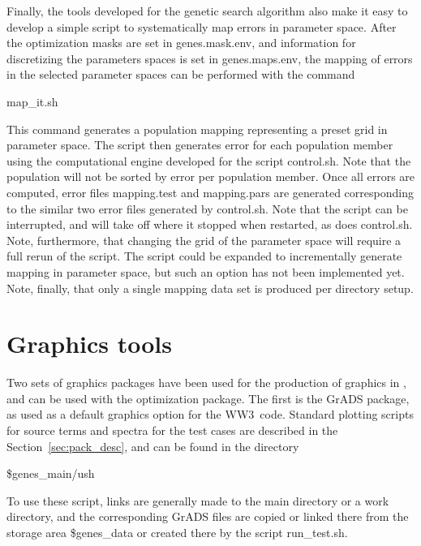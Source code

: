 \documentclass[12pt]{article}
\newcommand{\ws}{WW3}
\newcommand{\file}{\sf}
\newcommand{\pb}{\strut \vfill \pagebreak}
\newcommand{\bpage}{\vfill \pagebreak \strut

\vspace{2.5in} \centerline{This page is intentionally left blank.}}
\newcommand{\newsec}{\setcounter{equation}{0}
                      \setcounter{myfigno}{0}
                      \setcounter{mytabno}{0}}
\newcounter{myfigno}[section]
\newcounter{mytabno}[section]
\begin{document}
\vspace{\baselineskip}
\noindent
Finally, the tools developed for the genetic search algorithm also make it
easy to develop a simple script to systematically map errors in parameter
space. After the optimization masks are set in {\file genes.mask.env}, and
information for discretizing the parameters spaces is set in {\file
genes.maps.env}, the mapping of errors in the selected parameter spaces can be
performed with the command
\begin{center}
{\file map\_it.sh}
\end{center}
\noindent
This command generates a population {\file mapping} representing a preset grid
in parameter space. The script then generates error for each population member
using the computational engine developed for the script {\file
control.sh}. Note that the population will not be sorted by error per
population member. Once all errors are computed, error files {\file
mapping.test} and {\file mapping.pars} are generated corresponding to the
similar two error files generated by {\file control.sh}. Note that the script
can be interrupted, and will take off where it stopped when restarted, as does
{\file control.sh}. Note, furthermore, that changing the grid of the parameter
space will require a full rerun of the script. The script could be expanded to
incrementally generate mapping in parameter space, but such an option has not
been implemented yet. Note, finally, that only a single mapping data set is
produced per directory setup.


\pb
\section{Graphics tools} \label{sec:pack_graph}
\newsec

Two sets of graphics packages have been used for the production of graphics in
\cite{tol:MMABmanual}, and can be used with the optimization package. The first
is the GrADS package, as used as a default graphics option for the \ws\
code. Standard plotting scripts for source terms and spectra for the test
cases are described in the Section~\ref{sec:pack_desc}, and can be found in
the directory
\begin{center}
{\file \$genes\_main/ush}
\end{center}
\noindent
To use these script, links are generally made to the main directory or a work
directory, and the corresponding GrADS files are copied or linked there from
the storage area {\file \$genes\_data} or created there by the script {\file
run\_test.sh}.
\end{document}
